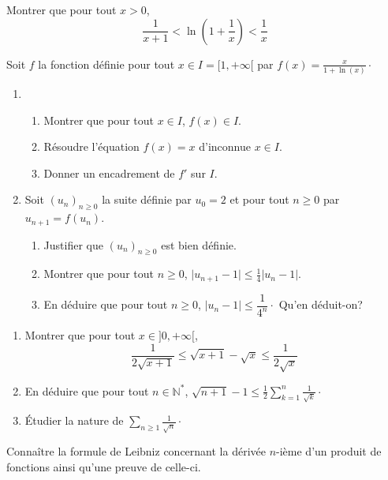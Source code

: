 \documentclass[a4paper,twoside,french,11pt]{VcCours}
\begin{document}
\begin{Exercice}{}
  Montrer que pour tout $x>0$,
  $$ \dfrac{1}{x+1} < \ln \left( 1 + \dfrac{1}{x} \right) < \dfrac{1}{x}$$
\end{Exercice} 

\begin{Exercice}{}
  Soit $f$ la fonction définie pour tout $x \in I=[1, + \infty[$ par $f(x) = \frac{x}{1+\ln(x)} \cdot$
  
  \begin{enumerate}
    \item
    \begin{enumerate}
      \item Montrer que pour tout $x \in I$, $f(x) \in I$.
      \item Résoudre l'équation $f(x)=x$ d'inconnue $x \in I$.
      \item Donner un encadrement de $f'$ sur $I$.
    \end{enumerate}
    \item Soit $(u_n)_{n \geq 0}$ la suite définie par $u_0=2$ et pour tout $n \geq 0$ par $u_{n+1}=f(u_n)$.
    \begin{enumerate}
      \item Justifier que $(u_n)_{n \geq 0}$ est bien définie.
      \item Montrer que pour tout $n\geq 0$, $\vert u_{n+1} - 1 \vert \leq \frac{1}{4} \vert u_n - 1 \vert$.
      \item En déduire que pour tout $n \geq 0$, $\vert u_n - 1 \vert \leq \dfrac{1}{4^n}\cdot$ Qu'en déduit-on?
    \end{enumerate}
  \end{enumerate}
\end{Exercice} 
  
\begin{Exercice}{} 
  \begin{enumerate}
    \item Montrer que pour tout $x \in ]0, + \infty[$,
    \[ \frac{1}{2\sqrt{x+1}} \leq \sqrt{x+1} - \sqrt{x} \leq \frac{1}{2\sqrt{x}} \]
    \item En déduire que pour tout $n \in \mathbb{N}^*$, $\sqrt{n+1} - 1 \leq \frac{1}{2} \sum_{k=1}^n \frac{1}{\sqrt{k}} \cdot$
    \item Étudier la nature de $\sum_{n \geq 1} \frac{1}{\sqrt{n}} \cdot$
  \end{enumerate}
\end{Exercice} 
  
  \begin{ptc}{}
    Connaître la formule de Leibniz concernant la dérivée $n$-ième d'un produit de fonctions ainsi qu'une preuve de celle-ci.
  \end{ptc}
\end{document}
